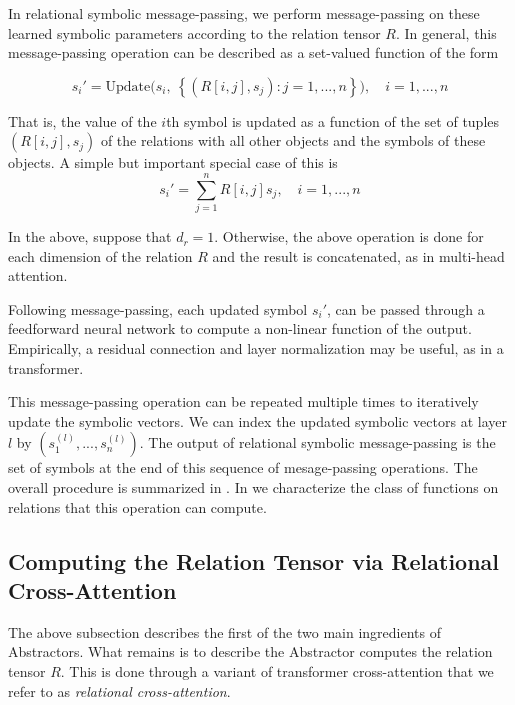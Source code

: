 In relational symbolic message-passing, we perform message-passing on these learned symbolic parameters according to the relation tensor $R$. In general, this message-passing operation can be described as a set-valued function of the form

\begin{equation}
    \label{eq:symbolic_message_passing}
    s_i' = \text{Update}\Big( s_i, \ \left\{ \left(R[i,j], s_j\right) \colon j=1, ..., n \right\}\Big), \quad i = 1, ..., n
\end{equation}

That is, the value of the $i$th symbol is updated as a function of the set of tuples $(R[i,j], s_j)$ of the relations with all other objects and the symbols of these objects. A simple but important special case of this is
\begin{equation}
    \label{eq:linear_symbolic_mp}
    s_i' = \sum_{j=1}^{n} R[i,j] s_j, \quad i=1, ..., n
\end{equation}

In the above, suppose that $d_r = 1$. Otherwise, the above operation is done for each dimension of the relation $R$ and the result is concatenated, as in multi-head attention.

Following message-passing, each updated symbol $s_i'$, can be passed through a feedforward neural network to compute a non-linear function of the output. Empirically, a residual connection and layer normalization may be useful, as in a transformer.

This message-passing operation can be repeated multiple times to iteratively update the symbolic vectors. We can index the updated symbolic vectors at layer $l$ by $(s_1^{(l)}, ..., s_n^{(l)})$. The output of relational symbolic message-passing is the set of symbols at the end of this sequence of mesage-passing operations. The overall procedure is summarized in . In  we characterize the class of functions on relations that this operation can compute.

\subsection{Computing the Relation Tensor via Relational Cross-Attention}

The above subsection describes the first of the two main ingredients of Abstractors. What remains is to describe the Abstractor computes the relation tensor $R$. This is done through a variant of transformer cross-attention that we refer to as \textit{relational cross-attention}.

